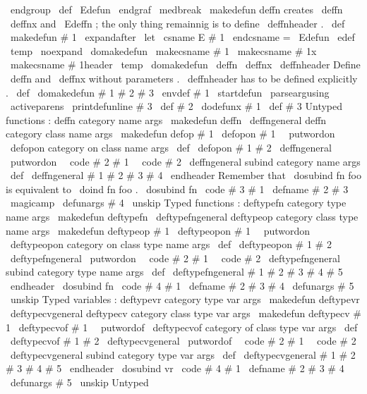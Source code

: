 {{\
endgroup
}
\
def
\
Edefun
{
\
endgraf
\
medbreak
}
%
\
makedefun
{
deffn
}
creates
\
deffn
\
deffnx
and
\
Edeffn
;
%
the
only
thing
remainnig
is
to
define
\
deffnheader
.
%
\
def
\
makedefun
#
1
{
%
\
expandafter
\
let
\
csname
E
#
1
\
endcsname
=
\
Edefun
\
edef
\
temp
{
\
noexpand
\
domakedefun
\
makecsname
{
#
1
}
\
makecsname
{
#
1x
}
\
makecsname
{
#
1header
}
}
%
\
temp
}
%
\
domakedefun
\
deffn
\
deffnx
\
deffnheader
%
%
Define
\
deffn
and
\
deffnx
without
parameters
.
%
\
deffnheader
has
to
be
defined
explicitly
.
%
\
def
\
domakedefun
#
1
#
2
#
3
{
%
\
envdef
#
1
{
%
\
startdefun
\
parseargusing
\
activeparens
{
\
printdefunline
#
3
}
%
}
%
\
def
#
2
{
\
dodefunx
#
1
}
%
\
def
#
3
%
}
%
%
%
Untyped
functions
:
%
deffn
category
name
args
\
makedefun
{
deffn
}
{
\
deffngeneral
{
}
}
%
deffn
category
class
name
args
\
makedefun
{
defop
}
#
1
{
\
defopon
{
#
1
\
\
putwordon
}
}
%
\
defopon
{
category
on
}
class
name
args
\
def
\
defopon
#
1
#
2
{
\
deffngeneral
{
\
putwordon
\
\
code
{
#
2
}
}
{
#
1
\
\
code
{
#
2
}
}
}
%
\
deffngeneral
{
subind
}
category
name
args
%
\
def
\
deffngeneral
#
1
#
2
#
3
#
4
\
endheader
{
%
%
Remember
that
\
dosubind
{
fn
}
{
foo
}
{
}
is
equivalent
to
\
doind
{
fn
}
{
foo
}
.
\
dosubind
{
fn
}
{
\
code
{
#
3
}
}
{
#
1
}
%
\
defname
{
#
2
}
{
}
{
#
3
}
\
magicamp
\
defunargs
{
#
4
\
unskip
}
%
}
%
%
%
Typed
functions
:
%
deftypefn
category
type
name
args
\
makedefun
{
deftypefn
}
{
\
deftypefngeneral
{
}
}
%
deftypeop
category
class
type
name
args
\
makedefun
{
deftypeop
}
#
1
{
\
deftypeopon
{
#
1
\
\
putwordon
}
}
%
\
deftypeopon
{
category
on
}
class
type
name
args
\
def
\
deftypeopon
#
1
#
2
{
\
deftypefngeneral
{
\
putwordon
\
\
code
{
#
2
}
}
{
#
1
\
\
code
{
#
2
}
}
}
%
\
deftypefngeneral
{
subind
}
category
type
name
args
%
\
def
\
deftypefngeneral
#
1
#
2
#
3
#
4
#
5
\
endheader
{
%
\
dosubind
{
fn
}
{
\
code
{
#
4
}
}
{
#
1
}
%
\
defname
{
#
2
}
{
#
3
}
{
#
4
}
\
defunargs
{
#
5
\
unskip
}
%
}
%
%
%
Typed
variables
:
%
deftypevr
category
type
var
args
\
makedefun
{
deftypevr
}
{
\
deftypecvgeneral
{
}
}
%
deftypecv
category
class
type
var
args
\
makedefun
{
deftypecv
}
#
1
{
\
deftypecvof
{
#
1
\
\
putwordof
}
}
%
\
deftypecvof
{
category
of
}
class
type
var
args
\
def
\
deftypecvof
#
1
#
2
{
\
deftypecvgeneral
{
\
putwordof
\
\
code
{
#
2
}
}
{
#
1
\
\
code
{
#
2
}
}
}
%
\
deftypecvgeneral
{
subind
}
category
type
var
args
%
\
def
\
deftypecvgeneral
#
1
#
2
#
3
#
4
#
5
\
endheader
{
%
\
dosubind
{
vr
}
{
\
code
{
#
4
}
}
{
#
1
}
%
\
defname
{
#
2
}
{
#
3
}
{
#
4
}
\
defunargs
{
#
5
\
unskip
}
%
}
%
%
%
Untyped
}
